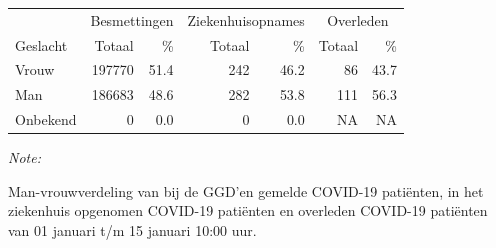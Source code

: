 \documentclass[
  english,
  man,floatsintext]{apa6}
\begin{document}
\begin{table}
\centering\begingroup\fontsize{11}{13}\selectfont

\begin{threeparttable}
\begin{tabular}{lrrrrrr}
\toprule
\multicolumn{1}{c}{ } & \multicolumn{2}{c}{Besmettingen} & \multicolumn{2}{c}{Ziekenhuisopnames} & \multicolumn{2}{c}{Overleden} \\
\cmidrule(l{3pt}r{3pt}){2-3} \cmidrule(l{3pt}r{3pt}){4-5} \cmidrule(l{3pt}r{3pt}){6-7}
Geslacht & Totaal & \% & Totaal & \% & Totaal & \%\\
\midrule
Vrouw & 197770 & 51.4 & 242 & 46.2 & 86 & 43.7\\
Man & 186683 & 48.6 & 282 & 53.8 & 111 & 56.3\\
Onbekend & 0 & 0.0 & 0 & 0.0 & NA & NA\\
\bottomrule
\end{tabular}
\begin{tablenotes}
\item \textit{Note: } 
\item Man-vrouwverdeling van bij de GGD’en gemelde COVID-19 patiënten, in het ziekenhuis opgenomen COVID-19 patiënten en overleden COVID-19 patiënten van 01 januari t/m 15 januari 10:00 uur.
\end{tablenotes}
\end{threeparttable}
\endgroup{}
\end{table}
\newpage
\end{document}
